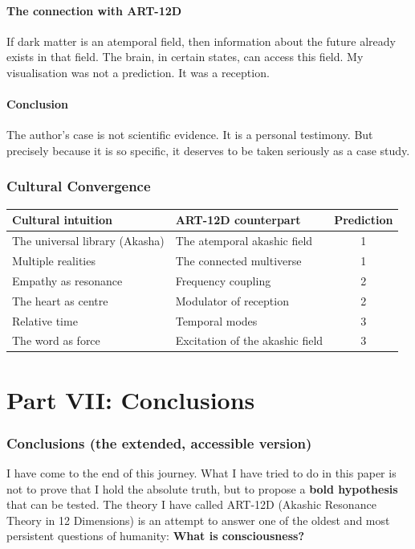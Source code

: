 \documentclass[11pt,a4paper]{article}
\begin{document}
\subsection{The connection with ART-12D}
If dark matter is an atemporal field, then information about the future already exists in that field. The brain, in certain states, can access this field. My visualisation was not a prediction. It was a reception.

\subsection{Conclusion}
The author's case is not scientific evidence. It is a personal testimony. But precisely because it is so specific, it deserves to be taken seriously as a case study.

\section{Cultural Convergence}
\begin{table}[H]
\centering
\begin{tabular}{@{}llc@{}}
\toprule
\textbf{Cultural intuition} & \textbf{ART-12D counterpart} & \textbf{Prediction} \\ \midrule
The universal library (Akasha) & The atemporal akashic field & 1 \\
Multiple realities & The connected multiverse & 1 \\
Empathy as resonance & Frequency coupling & 2 \\
The heart as centre & Modulator of reception & 2 \\
Relative time & Temporal modes & 3 \\
The word as force & Excitation of the akashic field & 3 \\ \bottomrule
\end{tabular}
\end{table}

\newpage
\part*{Part VII: Conclusions}

\section{Conclusions (the extended, accessible version)}
I have come to the end of this journey. What I have tried to do in this paper is not to prove that I hold the absolute truth, but to propose a \textbf{bold hypothesis} that can be tested. The theory I have called ART-12D (Akashic Resonance Theory in 12 Dimensions) is an attempt to answer one of the oldest and most persistent questions of humanity: \textbf{What is consciousness?}
\end{document}
